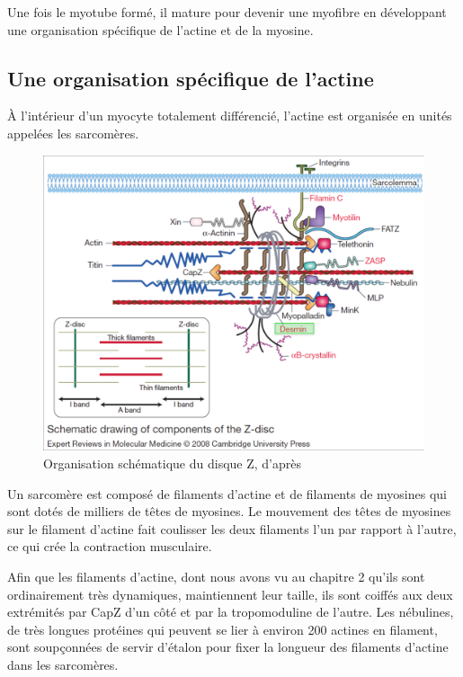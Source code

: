 Une fois le myotube formé, il mature pour devenir une myofibre en développant une organisation spécifique de l'actine et de la myosine.




\subsection{Une organisation spécifique de l'actine}

À l'intérieur d'un myocyte totalement différencié, l'actine est organisée en unités appelées les sarcomères. 

\begin{figure}
\includegraphics[scale=0.2]{Figures/sarcomere.png} 
\caption{Organisation schématique du disque Z, d'après \cite{ferrer_2008}}
\end{figure}

Un sarcomère est composé de filaments d'actine et de filaments de myosines qui sont dotés de milliers de têtes de myosines. Le mouvement des têtes de myosines sur le filament d'actine fait coulisser les deux filaments l'un par rapport à l'autre, ce qui crée la contraction musculaire. 

Afin que les filaments d'actine, dont nous avons vu au chapitre 2 qu'ils sont ordinairement très dynamiques, maintiennent leur taille, ils sont coiffés aux deux extrémités par CapZ d'un côté et par la tropomoduline de l'autre.
Les nébulines, de très longues protéines qui peuvent se lier à environ 200 actines en filament, sont soupçonnées de servir d'étalon pour fixer la longueur des filaments d'actine dans les sarcomères. 



